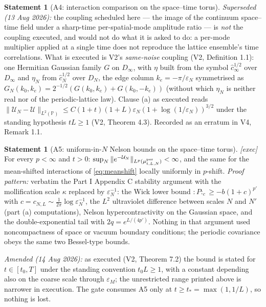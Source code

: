 \documentclass[11pt,a4paper]{article}
\theoremstyle{plain}
\theoremstyle{definition}
\newtheorem{statement}[theorem]{Statement}
\newcommand{\eps}{\varepsilon}
\begin{document}
\begin{statement}[A4: interaction comparison on the space--time torus]
\emph{Superseded (13 Aug 2026):} the coupling scheduled here --- the image of the
continuum space--time field under a sharp-time per-spatial-mode amplitude ratio --- is
\emph{not} the coupling executed, and would not do what it is asked to do: a per-mode
multiplier applied at a single time does not reproduce the lattice ensemble's time
correlations. What is executed is V2's \emph{same-noise} coupling (V2,
Definition 1.1): one Hermitian Gaussian family $G$ on $D_\infty$, with $\eta$ built
from the symbol $\hat c_\infty^{1/2}$ over $D_\infty$ and $\eta_N$ from
$\hat c_N^{1/2}$ over $D_N$, the edge column $k_e=-\pi/\eps_N$ symmetrised as
$G_N(k_0,k_e)=2^{-1/2}(G(k_0,k_e)+G(k_0,-k_e))$ (without which $\eta_N$ is neither real
nor of the periodic-lattice law). Clause (a) as executed reads
$\|\mathcal U_N-\mathcal U\|_{L^2(\mathbb P)}\le C(1+t)(1+L)\eps_N(1+\log(1/\eps_N))^{3/2}$ under the standing
hypothesis $tL\ge1$ (V2, Theorem 4.3). Recorded as an erratum in V4, Remark 1.1.
\end{statement}

\begin{statement}[A5: uniform-in-$N$ Nelson bounds on the space--time torus]
\label{st:A5}
\emph{[exec]} For every $p<\infty$ and $t>0$:
$\sup_N\|e^{-\mathcal U_N}\|_{L^p(\mu^{\rm per}_{t,L,N})}<\infty$, and the same for the
mean-shifted interactions of \eqref{eq:meanshift} locally uniformly in $p$-shift.
\emph{Proof pattern:} verbatim the Part I Appendix C stability argument with the
mollification scale $\kappa$ replaced by $\eps_N^{-1}$: the Wick lower bound
${:}P{:}_c\ge-b(1+c)^{p'}$ with $c=c_{N,L}\sim\tfrac1{2\pi}\log\eps_N^{-1}$, the $L^2$
ultraviolet difference between scales $N$ and $N'$ (part (a) computations), Nelson
hypercontractivity on the Gaussian space, and the double-exponential tail with
$2q=e^{L/(4p')}$. Nothing in that argument used noncompactness of space or vacuum
boundary conditions; the periodic covariance obeys the same two Bessel-type bounds.

\emph{Amended (14 Aug 2026):} as executed (V2, Theorem 7.2) the bound is stated for
$t\in[t_0,T]$ under the standing convention $t_0L\ge1$, with a constant depending also on
the coarse scale through $\eps_M$; the unrestricted range printed above is narrower in
execution. The gate consumes A5 only at $t\ge t_*=\max(1,1/L)$, so nothing is lost.
\end{statement}
\end{document}
